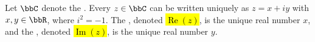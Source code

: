\begin{definition} \label{definition:real_and_imaginary_parts_of_a_complex_number}
    Let $\bbC$ denote the . Every $z \in \bbC$ can be written uniquely as $z = x + iy$ with $x, y \in \bbR$, where $i^2 = -1$. The , denoted \hl{$\operatorname{Re}(z)$}, is the unique real number $x$, and the , denoted \hl{$\operatorname{Im}(z)$}, is the unique real number $y$.
\end{definition}
